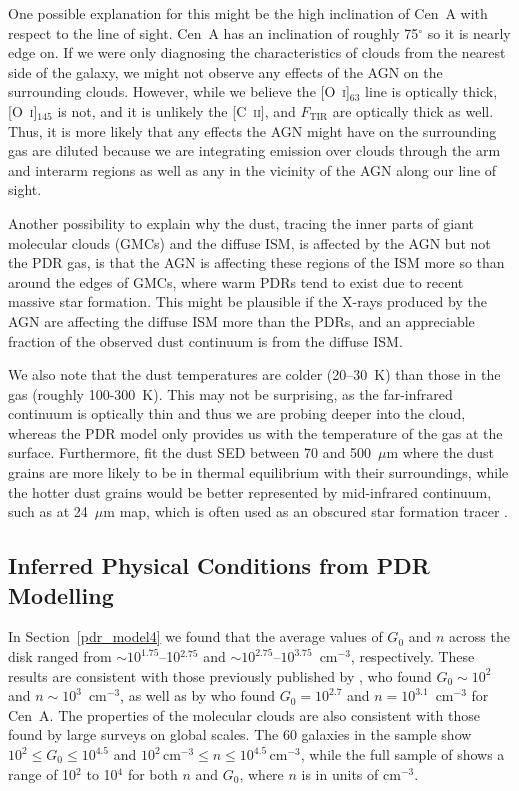 One possible explanation for this might be the high inclination of Cen~A with respect to the line of sight.  Cen~A has an inclination of roughly 75$^{\circ}$ \citep{2006ApJ...645.1092Q} so it is nearly edge on.  If we were only diagnosing the characteristics of clouds from the nearest side of the galaxy, we might not observe any effects of the AGN on the surrounding clouds.  However, while we believe the [O~\textsc{i}]$_{63}$ line is optically thick, [O~\textsc{i}]$_{145}$ is not, and it is unlikely the [C~\textsc{ii}], and $F_{\mathrm{TIR}}$ are optically thick as well.  Thus, it is more likely that any effects the AGN might have on the surrounding gas are diluted because we are integrating emission over clouds through the arm and interarm regions as well as any in the vicinity of the AGN along our line of sight.

Another possibility to explain why the dust, tracing the inner parts of giant molecular clouds (GMCs) and the diffuse ISM, is affected by the AGN but not the PDR gas, is that the AGN is affecting these regions of the ISM more so than around the edges of GMCs, where warm PDRs tend to exist due to recent massive star formation.  This might be plausible if the X-rays produced by the AGN are affecting the diffuse ISM more than the PDRs, and an appreciable fraction of the observed dust continuum is from the diffuse ISM.

We also note that the dust temperatures are colder (20--30~K) than those in the gas (roughly 100-300~K).  This may not be surprising, as the far-infrared continuum is optically thin and thus we are probing deeper into the cloud, whereas the PDR model only provides us with the temperature of the gas at the surface.  Furthermore,  \citet{2012MNRAS.422.2291P} fit the dust SED between 70 and 500~$\mu$m where the dust grains are more likely to be in thermal equilibrium with their surroundings, while the hotter dust grains would be better represented by mid-infrared continuum, such as at 24~$\mu$m map, which is often used as an obscured star formation tracer \citep{2005ApJ...632L..79W, 2007ApJ...666..870C, 2010ApJ...714.1256C, 2009ApJ...703.1672K}.


\subsection{Inferred Physical Conditions from PDR Modelling}\label{discuss_pdr}
In Section~\ref{pdr_model4} we found that the average values of $G_{0}$ and $n$ across the disk ranged from $\sim 10^{1.75}$--10$^{2.75}$ and $\sim 10^{2.75}$--$10^{3.75}$~cm$^{-3}$, respectively.  These results are consistent with those previously published by \citet{2000A&A...355..885U}, who found $G_{0} \sim 10^{2}$ and $n \sim 10^{3}$~cm$^{-3}$, as well as by \citet{2001A&A...375..566N} who found $G_{0} = 10^{2.7}$ and $n = 10^{3.1}$~cm$^{-3}$ for Cen~A.  The properties of the molecular clouds are also consistent with those found by large surveys on global scales.  The 60 galaxies in the \citet{2001ApJ...561..766M} sample show $10^{2} \le G_{0} \le 10^{4.5}$ and $10^{2}\,\mathrm{cm}^{-3} \le n \le 10^{4.5}\,\mathrm{cm}^{-3}$, while the full sample of \citet{2001A&A...375..566N} shows a range of 10$^{2}$ to 10$^{4}$ for both $n$ and $G_{0}$, where $n$ is in units of cm$^{-3}$.  

